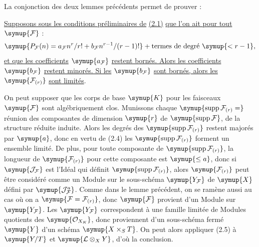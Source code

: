 La conjonction des deux lemmes précédents permet de prouver :

 \uline{Supposons sous les conditions préliminaires de} \uline{(2.1)} \uline{que
l'on ait pour tout} $\symup{\mathcal F}$ :
\[
\symup{P_{\mathcal F}(n)=a_{\mathcal F}n^r/r!+b_{\mathcal F}n^{r-1}/(r-1)!}+\text{termes de degré $\symup{<r-1}$},
\]
\uline{et que les coefficients} $\symup{a_{\mathcal F}}$ \uline{restent bornés. Alors les coefficients}
$\symup{b_{\mathcal F}}$ \uline{restent minorés. Si les} $\symup{b_{\mathcal F}}$ \uline{sont bornés, alors
les} $\symup{\mathcal F_{(r)}}$ \uline{sont limités}.

On peut supposer que les corps de base $\symup{K}$ pour les faisceaux $\symup{\mathcal F}$ sont
algébriquement clos. Munissons chaque
$\symup{\operatorname{supp}\mathcal F_{(r)}=}$ réunion des composantes de dimension
$\symup{r}$
de $\symup{\operatorname{supp}\mathcal F}$, de la structure réduite induite. Alors les
degrés des $\symup{\operatorname{supp}\mathcal F_{(r)}}$ restent majorés par $\symup{a}$, donc
en vertu de (2.4) les $\symup{\operatorname{supp}\mathcal F_{(r)}}$ forment un ensemble
limité. De plus, pour toute composante de
$\symup{\operatorname{supp}\mathcal F_{(r)}}$, la longueur de $\symup{\mathcal F_{(r)}}$ pour
cette composante est $\symup{\leq a}$, donc si $\symup{\mathcal J_{\mathcal F}}$ est l'Idéal
qui définit $\symup{\operatorname{supp}\mathcal F_{(r)}}$, alors $\symup{\mathcal F_{(r)}}$
peut être considéré comme un Module sur le sous-schéma $\symup{Y_{\mathcal F}}$ de $\symup{X}$
défini par $\symup{\mathcal J_{\mathcal F}^{a}}$. Comme dans le lemme précédent, on se
ramène aussi au cas où on a $\symup{\mathcal F=\mathcal F_{(r)}}$, donc $\symup{\mathcal F}$
provient d'un Module sur $\symup{Y_{\mathcal F}}$. Les $\symup{Y_{\mathcal F}}$ correspondent à
une famille limitée de Modules quotients des $\symup{\mathcal O_{X_K}}$, donc
proviennent d'un sous-schéma fermé $\symup{Y}$ d'un schéma $\symup{X\times_S T}$. On peut alors
appliquer (2.5) à $\symup{Y/T}$ et $\symup{\mathcal L\otimes_XY}$, d'où la conclusion.

